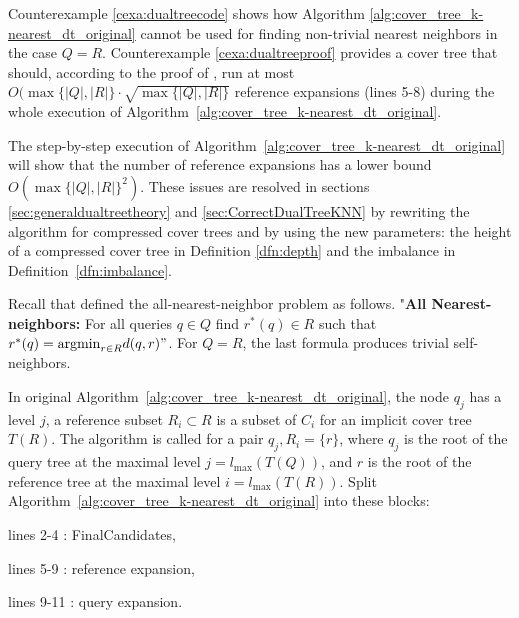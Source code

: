 \documentclass[a4paper,UKenglish,cleveref, autoref]{lipics-v2019}
\numberwithin{algocf}{section}
\theoremstyle{definition}
\theoremstyle{definition}
\theoremstyle{definition}
\theoremstyle{plain}
\begin{document}
Counterexample \ref{cexa:dualtreecode} shows how Algorithm \ref{alg:cover_tree_k-nearest_dt_original} cannot be used for finding non-trivial nearest neighbors in the case $Q = R$. 
Counterexample \ref{cexa:dualtreeproof} provides a cover tree that should, according to the proof of \cite[Theorem~3.1]{ram2009linear}, run at most $O(\max\{|Q|,|R|\} \cdot \sqrt{\max\{|Q|,|R|\}}$ reference expansions (lines 5-8) during the whole execution of Algorithm~\ref{alg:cover_tree_k-nearest_dt_original}. 
\medskip

The step-by-step execution of Algorithm~\ref{alg:cover_tree_k-nearest_dt_original} will show that the number of reference expansions has a lower bound $O(\max\{|Q|,|R|\}^2)$. 
These issues are resolved in sections \ref{sec:generaldualtreetheory} and \ref{sec:CorrectDualTreeKNN} by rewriting the algorithm for compressed cover trees and by using the new parameters: the height of a compressed cover tree in Definition \ref{dfn:depth} and the imbalance in Definition~\ref{dfn:imbalance}. 
\medskip
 
Recall that \cite[End of Section~1]{ram2009linear} defined the all-nearest-neighbor problem as follows. 
"\textbf{All Nearest-neighbors:} For all queries $q \in Q$ find $r^{*}(q) \in R$ such that $r^{*}(q) = \mathrm{argmin}_{r \in R}d(q,r)"$. 
For $Q=R$, the last formula produces trivial self-neighbors.
\medskip
 
In original Algorithm~\ref{alg:cover_tree_k-nearest_dt_original}, the node $q_j$ has a level $j$, a reference subset $R_i\subset R$ is a subset of $C_i$ for an implicit cover tree $T(R)$. 
The algorithm is called for a pair $q_j, R_{i} = \{r\}$, where $q_j$ is the root of the query tree at the maximal level $j = l_{\max}(T(Q))$,
and $r$ is the root of the reference tree at the maximal level $i = l_{\max}(T(R))$. 
Split Algorithm~\ref{alg:cover_tree_k-nearest_dt_original} into these blocks:
\smallskip

\noindent
lines 2-4 : FinalCandidates,
\smallskip

\noindent
lines 5-9 : reference expansion,
\smallskip

\noindent
lines 9-11 : query expansion. 
\end{document}
